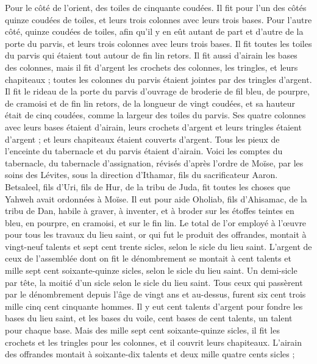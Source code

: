 \begin{multicols}{2}
Pour le côté de l'orient, des toiles de cinquante coudées.
Il fit pour l'un des côtés quinze coudées de toiles, et leurs trois colonnes avec leurs trois bases.
Pour l'autre côté, quinze coudées de toiles, afin qu'il y en eût autant de part et d’autre de la porte du parvis, et leurs trois colonnes avec leurs trois bases.
Il fit toutes les toiles du parvis qui étaient tout autour de fin lin retors.
Il fit aussi d'airain les bases des colonnes, mais il fit d'argent les crochets des colonnes, les tringles, et leurs chapiteaux ; toutes les colonnes du parvis étaient jointes par des tringles d’argent.
Il fit le rideau de la porte du parvis d'ouvrage de broderie de fil bleu, de pourpre, de cramoisi et de fin lin retors, de la longueur de vingt coudées, et sa hauteur était de cinq coudées, comme la largeur des toiles du parvis.
Ses quatre colonnes avec leurs bases étaient d'airain, leurs crochets d'argent et leurs tringles étaient d’argent ; et leurs chapiteaux étaient couverts d'argent.
Tous les pieux de l’enceinte du tabernacle et du parvis étaient d'airain.
Voici les comptes du tabernacle, du tabernacle d’assignation, révisés d’après l’ordre de Moïse, par les soins des Lévites, sous la direction d’Ithamar, fils du sacrificateur Aaron.
Betsaleel, fils d'Uri, fils de Hur, de la tribu de Juda, fit toutes les choses que Yahweh avait ordonnées à Moïse.
Il eut pour aide Oholiab, fils d'Ahisamac, de la tribu de Dan, habile à graver, à inventer, et à broder sur les étoffes teintes en bleu, en pourpre, en cramoisi, et sur le fin lin.
Le total de l’or employé à l’œuvre pour tous les travaux du lieu saint, or qui fut le produit des offrandes, montait à vingt-neuf talents et sept cent trente sicles, selon le sicle du lieu saint.
L'argent de ceux de l'assemblée dont on fit le dénombrement se montait à cent talents et mille sept cent soixante-quinze sicles, selon le sicle du lieu saint.
Un demi-sicle par tête, la moitié d'un sicle selon le sicle du lieu saint. Tous ceux qui passèrent par le dénombrement depuis l'âge de vingt ans et au-dessus, furent six cent trois mille cinq cent cinquante hommes.
Il y eut cent talents d'argent pour fondre les bases du lieu saint, et les bases du voile, cent bases de cent talents, un talent pour chaque base.
Mais des mille sept cent soixante-quinze sicles, il fit les crochets et les tringles pour les colonnes, et il couvrit leurs chapiteaux.
L'airain des offrandes montait à soixante-dix talents et deux mille quatre cents sicles ;

\end{multicols}
